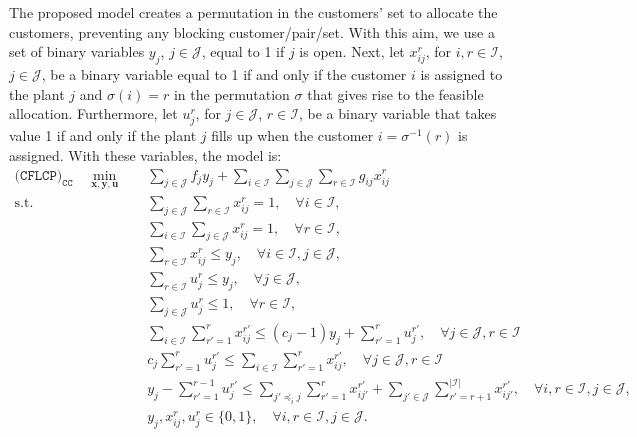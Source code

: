 \documentclass[preprint,11pt,authoryear]{elsarticle}
\def\J{\mathcal{J}}
\def\I{\mathcal{I}}
\begin{document}
The proposed model creates a permutation in the customers' set to allocate the customers, preventing any blocking customer/pair/set. With this aim, we use a set of binary variables $y_j$, $j\in \J$, equal to 1 if $j$ is open. Next, let $x_{ij}^r$, for $i,r\in \I$, $j\in \J$, be a binary variable equal to 1 if and only if the customer $i$ is assigned to the plant $j$ and $\sigma(i)=r$ in the permutation $\sigma$ that gives rise to the feasible allocation. Furthermore, let $u^r_j$, for $j\in \J$, $r\in \I$, be a binary variable that takes value 1 if and only if the plant $j$ fills up when the customer $i=\sigma^{-1}(r)$ is assigned. With these variables, the model is:
\begin{subequations} \label{CFLCProunds}
\begin{align} 
\texttt{(CFLCP)}_{\texttt{CC}} \quad \min_{\boldsymbol{x}, \boldsymbol{y}, \boldsymbol{u}} \quad & \sum_{j\in \J} f_jy_j + \sum_{i\in \I} \sum_{j\in \J} \sum_{r\in \I} g_{ij}x_{ij}^r  \label{CFLCPBrounds_OF1} \\
\text{s.t.} \quad & \sum_{j\in \J}\sum_{r\in\I} x_{ij}^r = 1, \quad \forall i\in \I, \label{CFLCPBrounds_allocation} \\
& \sum_{i \in \I}\sum_{j\in\J} x_{ij}^r = 1, \quad \forall r\in \I, \label{CFLCPBrounds_allocation2} \\
& \sum_{r\in \I} x_{ij}^r  \le y_j, \quad \forall i\in \I,j\in\J, \label{CFLCPBrounds_assignmenttoopenplants}\\
& \sum_{r\in \I} u_j^r \le y_j, \quad \forall j\in\J, \label{CFLCPBrounds_seagotasiseabre} \\
& \sum_{j\in \J} u_j^r \le 1, \quad \forall r\in\I, \label{CFLCPbrounds_seagotaunacadavez} \\
&  \sum_{i\in \I} \sum_{r'=1}^r x^{r'}_{ij} \le (c_j-1)y_j + \sum_{r'=1}^r u_j^{r'}, \quad \forall j\in\J, r \in \I  \label{CFLCPBrounds_uiguala0} \\
& c_j\sum_{r'=1}^r u_j^{r'} \le \sum_{i\in \I}\sum_{r'=1}^r x^{r'}_{ij}, \quad \forall j\in \J,r\in\I  \label{CFLCPBrounds_uiguala1} \\
&  y_j - \sum_{r'=1}^{r-1} u_j^{r'} \le \sum_{j' \preceq_i j}\sum_{r'=1}^r x_{ij'}^{r'} + \sum_{j'\in \J} \sum_{r'=r+1}^{|\I|}  x_{ij'}^{r'}, \quad \forall i,r\in \I,j\in\J, \label{CFLCPBrounds_preferences} \\
& y_j, x_{ij}^r, u_j^r \in \{0,1\}, \quad \forall i,r \in \I, j \in \J.  \label{CFLCPBrounds_binarias}
\end{align}
\end{subequations}
\end{document}
